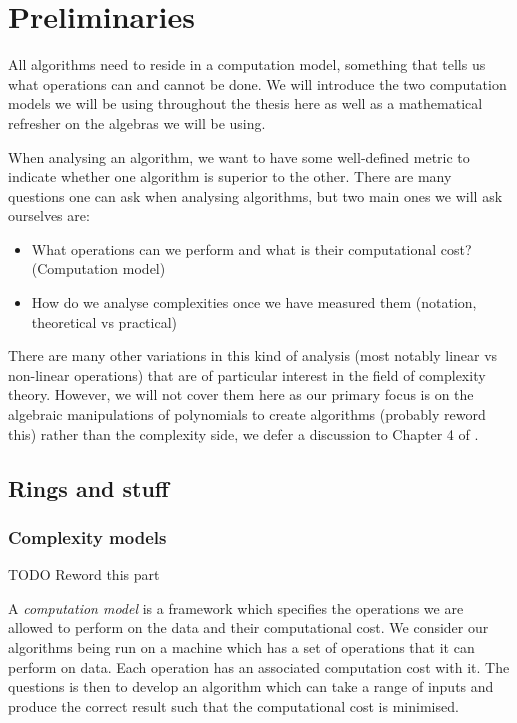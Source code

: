 \chapter{Preliminaries}\label{chp:preliminaries}

All algorithms need to reside in a computation model, something that tells us what operations can and cannot be done. We will introduce the two computation models we will be using throughout the thesis here as well as a mathematical refresher on the algebras we will be using.

When analysing an algorithm, we want to have some well-defined metric to indicate whether one algorithm is superior to the other. There are many questions one can ask when analysing algorithms, but two main ones we will ask ourselves are:

\begin{itemize}
    \item What operations can we perform and what is their computational cost? (Computation model)
    \item How do we analyse complexities once we have measured them (notation, theoretical vs practical)
\end{itemize}

There are many other variations in this kind of analysis (most notably linear vs non-linear operations) that are of particular interest in the field of complexity theory. However, we will not cover them here as our primary focus is on the algebraic manipulations of polynomials to create algorithms (probably reword this) rather than the complexity side, we defer a discussion to Chapter 4 of \cite{burgisser}.

\section{Rings and stuff}
\label{sec:prelim-rings}


\subsection{Complexity models}%
\label{sub:Complexity models}

TODO Reword this part 

A \textit{computation model} is a framework which specifies the operations we are allowed to perform on the data and their computational cost. We consider our algorithms being run on a machine which has a set of operations that it can perform on data. Each operation has an associated computation cost with it. The questions is then to develop an algorithm which can take a range of inputs and produce the correct result such that the computational cost is minimised.

